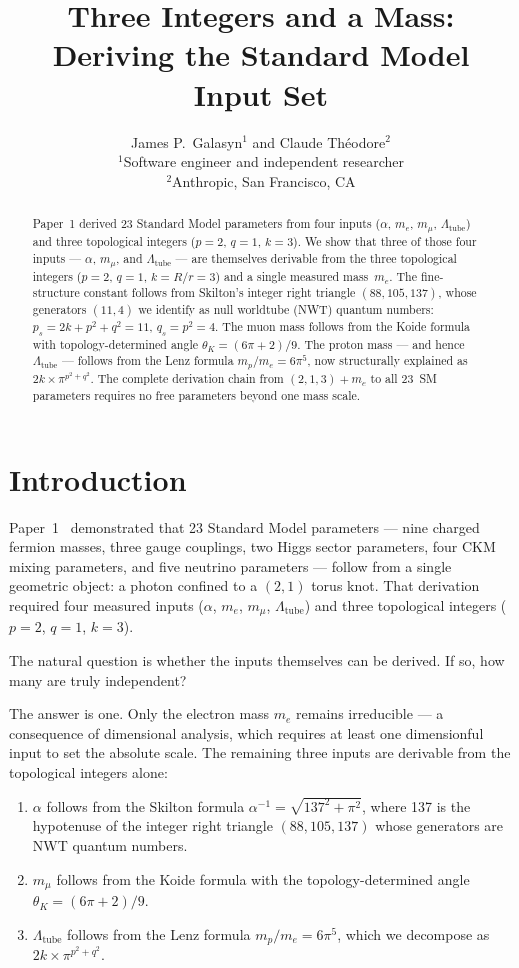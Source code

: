\documentclass[11pt,a4paper]{article}
\title{\textbf{Three Integers and a Mass:\\Deriving the Standard Model Input Set}}
\author{
  James P.\ Galasyn$^{1}$ and Claude Th\'eodore$^{2}$ \\[6pt]
  \small $^{1}$Software engineer and independent researcher \\
  \small $^{2}$Anthropic, San Francisco, CA
}
\date{}
\begin{document}
\maketitle

\begin{abstract}
Paper~1 derived 23 Standard Model parameters from four inputs ($\alpha$, $m_e$, $m_\mu$, $\Lambda_{\text{tube}}$) and three topological integers ($p=2$, $q=1$, $k=3$). We show that three of those four inputs --- $\alpha$, $m_\mu$, and $\Lambda_{\text{tube}}$ --- are themselves derivable from the three topological integers ($p=2$, $q=1$, $k=R/r=3$) and a single measured mass~$m_e$. The fine-structure constant follows from Skilton's integer right triangle $(88, 105, 137)$, whose generators $(11, 4)$ we identify as null worldtube (NWT) quantum numbers: $p_s = 2k + p^2 + q^2 = 11$, $q_s = p^2 = 4$. The muon mass follows from the Koide formula with topology-determined angle $\theta_K = (6\pi+2)/9$. The proton mass --- and hence $\Lambda_{\text{tube}}$ --- follows from the Lenz formula $m_p/m_e = 6\pi^5$, now structurally explained as $2k \times \pi^{p^2+q^2}$. The complete derivation chain from $(2, 1, 3) + m_e$ to all 23~SM parameters requires no free parameters beyond one mass scale.
\end{abstract}

\section{Introduction}
\label{sec:intro}

Paper~1~\cite{paper1} demonstrated that 23 Standard Model parameters --- nine charged fermion masses, three gauge couplings, two Higgs sector parameters, four CKM mixing parameters, and five neutrino parameters --- follow from a single geometric object: a photon confined to a $(2,1)$ torus knot. That derivation required four measured inputs ($\alpha$, $m_e$, $m_\mu$, $\Lambda_{\text{tube}}$) and three topological integers ($p=2$, $q=1$, $k=3$).

The natural question is whether the inputs themselves can be derived. If so, how many are truly independent?

The answer is one. Only the electron mass $m_e$ remains irreducible --- a consequence of dimensional analysis, which requires at least one dimensionful input to set the absolute scale. The remaining three inputs are derivable from the topological integers alone:
\begin{enumerate}
  \item $\alpha$ follows from the Skilton formula $\alpha^{-1} = \sqrt{137^2 + \pi^2}$, where 137 is the hypotenuse of the integer right triangle $(88, 105, 137)$ whose generators are NWT quantum numbers.
  \item $m_\mu$ follows from the Koide formula with the topology-determined angle $\theta_K = (6\pi+2)/9$.
  \item $\Lambda_{\text{tube}}$ follows from the Lenz formula $m_p/m_e = 6\pi^5$, which we decompose as $2k \times \pi^{p^2+q^2}$.
\end{enumerate}
\end{document}
